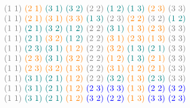 \begin{xmpl}
$$\begin{tabular}{c}
		\textcolor{gray}{(1 1)} \textcolor{orange}{(2 1)} \textcolor{teal}{(3 1)} \textcolor{teal}{(3 2)} \textcolor{gray}{(2 2)} \textcolor{teal}{(1 2)} \textcolor{teal}{(1 3)} \textcolor{orange}{(2 3)} \textcolor{gray}{(3 3)}\\
		\textcolor{gray}{(1 1)} \textcolor{orange}{(2 1)} \textcolor{orange}{(3 1)} \textcolor{orange}{(3 3)} \textcolor{teal}{(1 3)} \textcolor{gray}{(2 3)} \textcolor{orange}{(2 2)} \textcolor{gray}{(3 2)} \textcolor{teal}{(1 2)}\\
		\textcolor{gray}{(1 1)} \textcolor{teal}{(2 1)} \textcolor{teal}{(3 2)} \textcolor{teal}{(1 2)} \textcolor{gray}{(2 2)} \textcolor{teal}{(3 1)} \textcolor{orange}{(1 3)} \textcolor{orange}{(2 3)} \textcolor{gray}{(3 3)}\\
		\textcolor{gray}{(1 1)} \textcolor{teal}{(2 1)} \textcolor{orange}{(3 2)} \textcolor{teal}{(1 2)} \textcolor{gray}{(2 2)} \textcolor{orange}{(3 1)} \textcolor{orange}{(2 3)} \textcolor{orange}{(1 3)} \textcolor{gray}{(3 3)}\\
		\textcolor{gray}{(1 1)} \textcolor{teal}{(2 3)} \textcolor{teal}{(3 1)} \textcolor{orange}{(1 2)} \textcolor{gray}{(2 2)} \textcolor{orange}{(3 2)} \textcolor{teal}{(1 3)} \textcolor{teal}{(2 1)} \textcolor{gray}{(3 3)}\\
		\textcolor{gray}{(1 1)} \textcolor{orange}{(2 3)} \textcolor{teal}{(3 1)} \textcolor{orange}{(3 2)} \textcolor{gray}{(2 2)} \textcolor{orange}{(1 2)} \textcolor{teal}{(1 3)} \textcolor{orange}{(2 1)} \textcolor{gray}{(3 3)}\\
		\textcolor{gray}{(1 1)} \textcolor{orange}{(2 3)} \textcolor{orange}{(3 2)} \textcolor{orange}{(1 3)} \textcolor{gray}{(2 2)} \textcolor{orange}{(3 1)} \textcolor{orange}{(1 2)} \textcolor{orange}{(2 1)} \textcolor{gray}{(3 3)}\\
		\textcolor{gray}{(1 1)} \textcolor{teal}{(3 1)} \textcolor{teal}{(2 1)} \textcolor{orange}{(1 2)} \textcolor{gray}{(2 2)} \textcolor{teal}{(3 2)} \textcolor{orange}{(1 3)} \textcolor{teal}{(2 3)} \textcolor{gray}{(3 3)}\\
		\textcolor{gray}{(1 1)} \textcolor{teal}{(3 1)} \textcolor{teal}{(2 1)} \textcolor{orange}{(1 2)} \textcolor{blue}{(2 3)} \textcolor{blue}{(3 3)} \textcolor{orange}{(1 3)} \textcolor{blue}{(2 2)} \textcolor{blue}{(3 2)}\\
		\textcolor{gray}{(1 1)} \textcolor{teal}{(3 1)} \textcolor{teal}{(2 1)} \textcolor{orange}{(1 2)} \textcolor{blue}{(3 2)} \textcolor{blue}{(2 2)} \textcolor{orange}{(1 3)} \textcolor{blue}{(3 3)} \textcolor{blue}{(2 3)}\\

\end{tabular}$$
\end{xmpl}

